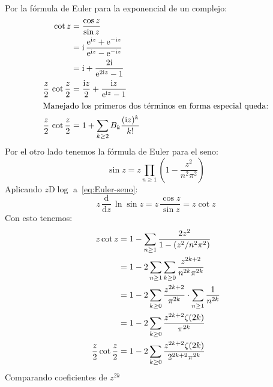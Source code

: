   Por la fórmula de Euler para la exponencial de un complejo:%
  \begin{align}
    \cot z
      &= \frac{\cos z}{\sin z} \notag \\
      &= \mathrm{i} \, \frac{\mathrm{e}^{\mathrm{i} z}
			     + \mathrm{e}^{- \mathrm{i} z}}
		{\mathrm{e}^{\mathrm{i} z}
		  - \mathrm{e}^{- \mathrm{i} z}}
	     \notag \\
      &= \mathrm{i} + \frac{2 \mathrm{i}}
			   {\mathrm{e}^{2 \mathrm{i} z} - 1}
	     \notag \\
    \frac{z}{2} \, \cot \frac{z}{2}
      &= \frac{\mathrm{i} z}{2}
	   + \frac{\mathrm{i} z}{\mathrm{e}^{\mathrm{i} z} - 1}
	     \notag \\
    \intertext{Manejado los primeros dos términos
	       en forma especial queda:}
    \frac{z}{2} \, \cot \frac{z}{2}
      &= 1 + \sum_{k \ge 2} B_k \frac{(\mathrm{i} z)^k}{k!}
	   \label{eq:zcotz-1}
  \end{align}
  Por el otro lado tenemos la fórmula de Euler para el seno:%
  \begin{equation}
    \label{eq:Euler-seno}
    \sin z
      = z \prod_{n \ge 1} \left( 1 - \frac{z^2}{n^2 \pi^2} \right)
  \end{equation}
  Aplicando \(z \mathrm{D} \log\) a~\eqref{eq:Euler-seno}:
  \begin{equation*}
    z \, \frac{\mathrm{d}}{\mathrm{d} z} \, \ln \sin z
      = z \, \frac{\cos z}{\sin z}
      = z \cot z
  \end{equation*}
  Con esto tenemos:
  \begin{align}
    z \cot z
      &= 1 - \sum_{n \ge 1} \frac{2 z^2}{1 - (z^2 / n^2 \pi^2)}
	  \notag \\
      &= 1 - 2 \sum_{n \ge 1}
		 \sum_{k \ge 0} \frac{z^{2 k + 2}}
				     {n^{2 k} \pi^{2 k}} \notag \\
      &= 1 - 2 \sum_{k \ge 0}
		 \frac{z^{2 k + 2}}{\pi^{2 k}}
		    \cdot \sum_{n \ge 1} \frac{1}{n^{2 k}} \notag \\
      &= 1 - 2 \sum_{k \ge 0} \frac{z^{2 k + 2} \zeta(2 k)}
				   {\pi^{2 k}}
						    \notag \\
    \frac{z}{2} \cot \frac{z}{2}
      &= 1 - 2 \sum_{k \ge 0}
		 \frac{z^{2 k + 2} \zeta(2 k)}
		      {2^{2 k + 2} \pi^{2 k}}
		    \label{eq:zcotz-2}
  \end{align}
  Comparando coeficientes de \(z^{2 k}\)
